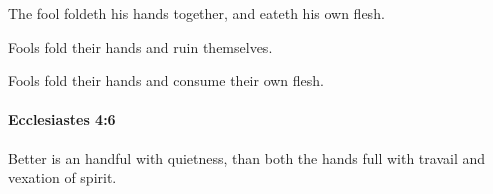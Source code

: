			\begin{versebox}
					\item[BHS] 
					\item[LXX] 
					\item[ASV] The fool foldeth his hands together, and eateth his own flesh.
					\item[NIV] Fools fold their hands and ruin themselves.
					\item[NRSV] Fools fold their hands and consume their own flesh.
			\end{versebox}

		\paragraph{Ecclesiastes 4:6} %
			\label{ECCLESIASTES-4-6}

			Better is an handful with quietness, than both the hands full with travail and vexation of spirit.


